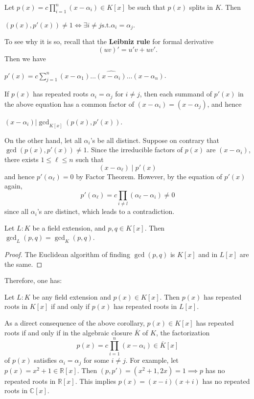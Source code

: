 \begin{example}
Let $p(x) = c \prod_{i=1}^n (x-\alpha_i) \in K[x]$ be such that $p(x)$ splits in $K$. Then 
\begin{center}
$(p(x), p'(x)) \neq 1 \iff \exists i \neq j \mathrm{ s.t. } \alpha_i = \alpha_j$.    
\end{center}
To see why it is so, recall that the {\bf Leibniz rule} for formal derivative
$$(uv)' = u'v + uv'.$$
Then we have
\begin{center}
    \(p'(x) = c \displaystyle \sum_{j=1}^n (x-\alpha_1)\dots \widehat{(x-\alpha_i)} \dots (x-\alpha_n)\).
\end{center}

If \(p(x)\) has repeated roots $\alpha_i = \alpha_j$ for $i \neq j$, then each summand of $p'(x)$ in the above equation has a common factor of $(x-\alpha_i) = (x-\alpha_j)$, and hence
\begin{center}
     \((x-\alpha_i) | \gcd_{K[x]}\left(p(x), p'(x)\right)\).
\end{center}

On the other hand, let all $\alpha_i$'s be all distinct. Suppose on contrary that $\gcd(p(x), p'(x)) \neq 1$. Since the irreducible factors of $p(x)$ are $(x-\alpha_i)$, there exists $1 \leq \ell \leq n$ such that
$$(x-\alpha_{\ell}) \mid p'(x)$$
and hence $p'(\alpha_{\ell}) = 0$ by Factor Theorem. However, by the equation of $p'(x)$ again, 
$$p'(\alpha_{\ell}) = c \prod_{i \neq l} (\alpha_{\ell} - \alpha_i) \neq 0$$
since all $\alpha_i$'s are distinct, which leads to a contradiction.
\end{example}


\begin{lemma}
    Let $L:K$ be a field extension, and $p, q \in K[x]$. Then $\gcd_L(p, q) = \gcd_K(p, q)$.
\end{lemma} 
\begin{proof}
    The Euclidean algorithm of finding $\gcd(p, q)$ is $K[x]$ and in $L[x]$ are the same.
\end{proof} 

Therefore, one has:
\begin{corollary}\label{cor-sepPolyFieldExt}
    Let $L:K$ be any field extension and $p(x) \in K[x]$. Then $p(x)$ has repeated roots in $K[x]$ if and only if $p(x)$ has repeated roots in $L[x]$.
\end{corollary}

As a direct consequence of the above corollary, $p(x) \in K[x]$ has repeated roots if and only if in the algebraic closure $\overline{K}$ of $K$, the factorization 
$$p(x) = c \prod_{i=1}^n(x - \alpha_i) \in \overline{K}[x]$$
of $p(x)$ satisfies $\alpha_i = \alpha_j$ for some 
$i \neq j$. For example, let $p(x) = x^2+1 \in \mathbb{R}[x]$. Then $(p, p') = (x^2+1, 2x) = 1 \implies p$ has no repeated roots in $\mathbb{R}[x]$. This implies $p(x) = (x-i)(x+i)$ has no repeated roots in $\mathbb{C}[x]$.

